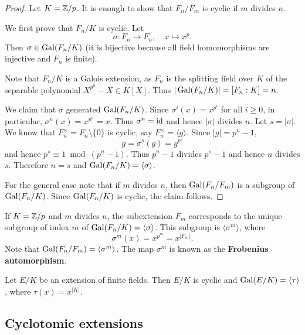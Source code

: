 \begin{proof}
    Let $K=\mathbb{Z}/p$. It is enough to show that $F_n/F_m$ is cyclic if $m$ divides $n$. 
    
    We first prove that $F_n/K$ is cyclic. 
    Let 
    \[
    \sigma\colon F_n\to F_n,\quad 
    x\mapsto x^p.
    \]
    Then 
    $\sigma\in\operatorname{Gal}(F_n/K)$ (it is bijective because all field homomorphisms 
    are injective and $F_n$ is finite). 

    Note that 
    $F_n/K$ is a Galois extension, as $F_n$ is the splitting
    field over $K$ 
    of the separable polynomial $X^{p^n}-X\in K[X]$. 
    Thus $|\operatorname{Gal}(F_n/K)|=[F_n:K]=n$. 
    
    We claim that $\sigma$ generated $\operatorname{Gal}(F_n/K)$. Since 
    $\sigma^i(x)=x^{p^i}$ for all $i\geq 0$, in particular, 
    $\sigma^n(x)=x^{p^n}=x$. Thus $\sigma^n=\operatorname{id}$ and hence $|\sigma|$ divides $n$. Let 
    $s=|\sigma|$. We know that $F_n^{\times}=F_n\setminus\{0\}$ is
    cyclic, say $F_n^{\times}=\langle g\rangle$. Since $|g|=p^n-1$, 
    \[
    g=\sigma^s(g)=g^{p^s}
    \]
    and hence $p^s\equiv 1\bmod (p^n-1)$. Thus $p^n-1$ divides $p^s-1$ and
    hence $n$ divides $s$. Therefore $n=s$ and $\operatorname{Gal}(F_n/K)=\langle\sigma\rangle$. 
    
    For the general case note that if $m$ divides $n$, 
    then $\operatorname{Gal}(F_n/F_m)$ is a subgroup of $\operatorname{Gal}(F_n/K)$. Since  $\operatorname{Gal}(F_n/K)$ is cyclic, 
    the claim follows.
\end{proof}

If $K=\mathbb{Z}/p$ and 
$m$ divides $n$, the subextension $F_m$ corresponds 
to the unique
subgroup of index $m$ of $\operatorname{Gal}(F_n/K)=\langle\sigma\rangle$. This subgroup
is $\langle\sigma^m\rangle$, where
\[
\sigma^m(x)=x^{p^m}=x^{|F_m|}.
\]
Note that $\operatorname{Gal}(F_n/F_m)=\langle\sigma^m\rangle$. 
The map $\sigma^m$ is known as 
the \textbf{Frobenius automorphism}. 

\begin{exercise}
    Let $E/K$ be an extension of finite fields. Then $E/K$ 
    is cyclic and $\operatorname{Gal}(E/K)=\langle\tau\rangle$, where $\tau(x)=x^{|K|}$. 
\end{exercise}




\subsection{Cyclotomic extensions}

